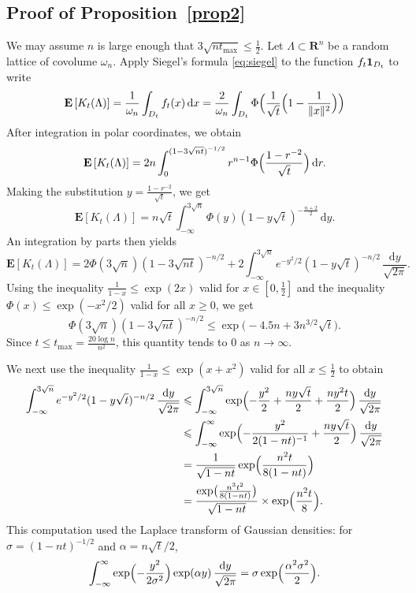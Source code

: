 \documentclass[12pt]{amsart}
\newcommand{\R}{\mathbf{R}}
\newcommand{\E}{\mathbf{E}}
\newcommand{\iy}{\infty}
\renewcommand{\leq}{\leqslant}
\renewcommand{\geq}{\geqslant}
\theoremstyle{plain}
\theoremstyle{remark}
\begin{document}
\subsection{Proof of Proposition~\ref{prop2}}
 
We may assume $n$ is large enough that $3\sqrt{nt_{\max}} \leq \frac{1}{2}$. Let $\Lambda \subset \R^n$ be a random lattice of covolume $\omega_n$.
Apply Siegel's formula \eqref{eq:siegel} to the function $f_t {\bf 1}_{D_t}$ to write
\[ \E \left[ K_t(\Lambda) \right]  = \frac{1}{\omega_n} \int_{D_t} f_t(x) \, \mathrm{d}x = \frac{2}{\omega_n} \int_{D_t} \Phi \Bigl( \frac{1}{\sqrt{t}} \Bigl(1 - \frac{1}{\|x\|^2}\Bigr) \Bigr) \]
After integration in polar coordinates, we obtain
\[ \E \left[ K_t(\Lambda) \right]
= 2n \int_0^{(1-3 \sqrt{nt})^{-1/2}} r^{n-1} \Phi \Bigl( \frac{1 - r^{-2}}{\sqrt{t}} \Bigr) \, \mathrm{d}r.
\]
Making the substitution $y=\frac{1-r^{-2}}{\sqrt{t}}$, we get
 \[ \E \left[ K_t(\Lambda) \right] = n \sqrt{t} \int_{-\iy}^{3 \sqrt{n}} \Phi(y) ( 1 - y \sqrt{t})^{-\frac{n+2}{2}} \, \mathrm{d}y. \]
An integration by parts then yields
\[
\E \left[ K_t(\Lambda) \right] = 2 \Phi(3\sqrt{n})(1-3\sqrt{nt})^{-n/2} + 2 \int_{-\iy}^{3 \sqrt{n}} e^{-y^2/2} (1-y \sqrt{t})^{-n/2} \, \frac{\mathrm{d}y}{\sqrt{2\pi}} .\]
 Using the inequality $\frac{1}{1-x} \leq \exp(2x)$ valid for $x \in [0,\frac{1}{2}]$ and the inequality $\Phi(x) \leq \exp(-x^2/2)$ valid for all $x \geq 0$, we get
\[ \Phi(3\sqrt{n})(1-3\sqrt{nt})^{-n/2} \leq \exp \bigl(- 4.5n + 3 n^{3/2} \sqrt{t} \bigr). \]
Since $t \leq t_{\max} = \frac{20 \log n}{n^2}$, this quantity tends to $0$ as $n \to \infty$.
 
We next use the inequality $\frac{1}{1-x} \leq \exp(x+x^2)$ valid for all $x \leq \frac{1}{2}$ to obtain
\begin{align*}
 \int_{-\iy}^{3 \sqrt{n}} e^{-y^2/2} (1-y \sqrt{t})^{-n/2} \,
 \frac{\mathrm{d}y}{\sqrt{2\pi}} & \leq \int_{-\iy}^{3 \sqrt{n}} \exp \Bigl(-\frac{y^2}{2} +  \frac{ny \sqrt{t}}{2} + \frac{ny^2t}{2} \Bigr) \, \frac{\mathrm{d}y}{\sqrt{2\pi}} \\
 & \leq \int_{-\iy}^{\iy} \exp \Bigl(-\frac{y^2}{2(1-nt)^{-1}} +  \frac{ny \sqrt{t}}{2} \Bigr) \, \frac{\mathrm{d}y}{\sqrt{2\pi}} \\
 & = \frac{1}{\sqrt{1-nt}} \exp \Bigl( \frac{n^2 t}{8 (1-nt)} \Bigr) \\
 & = \frac{\exp \bigl( \frac{n^3t^2}{8(1-nt)} \bigr)}{\sqrt{1-nt}}
 \times \exp \Bigl( \frac{n^2t}{8} \Bigr).
\end{align*}
This computation used the Laplace transform of Gaussian densities: for $\sigma=(1-nt)^{-1/2}$ and $\alpha  = n\sqrt{t}/2$,
\[
\int_{-\iy}^{\iy} \exp \Bigl( -\frac{y^2}{2\sigma^2} \Bigr) \exp(\alpha y) \, \frac{\mathrm{d}y}{\sqrt{2\pi}}= \sigma \exp \Bigl( \frac{\alpha^2\sigma^2}{2} \Bigr).
\]
 
\end{document}
